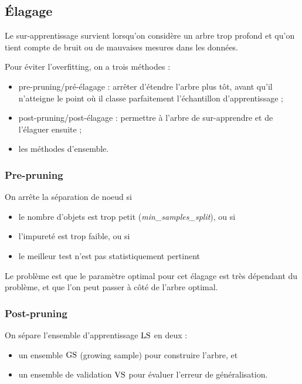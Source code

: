 			
	\subsection{Élagage}

	Le sur-apprentissage survient lorsqu'on considère un arbre trop profond et qu'on tient compte de bruit ou de mauvaises mesures dans les données.
	
	
	Pour éviter l'overfitting, on a trois méthodes :
	
	\begin{itemize}
		\item pre-pruning/pré-élagage : arrêter d'étendre l'arbre plus tôt, avant qu'il n'atteigne le point où il classe parfaitement l'échantillon d'apprentissage ;
		\item post-pruning/post-élagage : permettre à l'arbre de sur-apprendre et de l'élaguer ensuite ;
		\item les méthodes d'ensemble.
	\end{itemize}
	
	
	
		\subsubsection{Pre-pruning}
		
		On arrête la séparation de noeud si
		
		\begin{itemize}
			\item le nombre d'objets est trop petit (\textit{min\_samples\_split}), ou si
			\item l'impureté est trop faible, ou si
			\item le meilleur test n'est pas statistiquement pertinent
		\end{itemize}
		
		Le problème est que le paramètre optimal pour cet élagage est très dépendant du problème, et que l'on peut passer à côté de l'arbre optimal.
		
		
		\subsubsection{Post-pruning}
		
		On sépare l'ensemble d'apprentissage $\text{LS}$ en deux :
		
		\begin{itemize}
			\item un ensemble $\text{GS}$ (growing sample) pour construire l'arbre, et
			\item un ensemble de validation $\text{VS}$ pour évaluer l'erreur de généralisation.
		\end{itemize}
		
